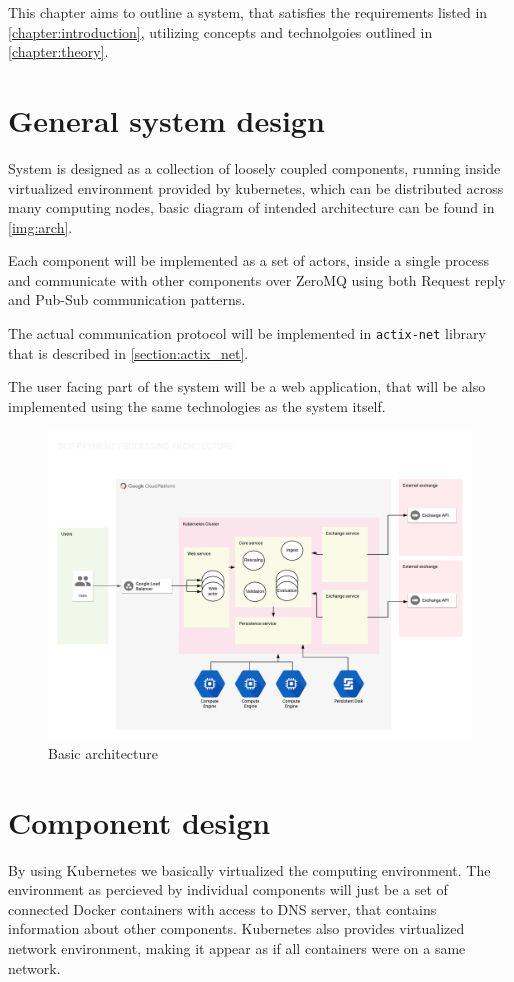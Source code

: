 This chapter aims to outline a system, that satisfies the requirements listed in \autoref{chapter:introduction}, utilizing
concepts and technolgoies outlined in \autoref{chapter:theory}.


\section{General system design}
System is designed as a collection of loosely coupled components, running inside virtualized environment provided by kubernetes, which
can be distributed across many computing nodes, basic diagram of intended architecture can be found in \autoref{img:arch}.

Each component will be implemented as a set of actors, inside a single process and communicate with other components
over ZeroMQ using both Request reply and Pub-Sub communication patterns.

The actual communication protocol will be implemented in \verb|actix-net| library that is described in \autoref{section:actix_net}.

The user facing part of the system will be a web application, that will be also implemented using the same technologies
as the system itself.

\begin{figure}[H]
    \includegraphics[width=\textwidth]{obrazky-figures/Basic architecture.png}
    \caption{Basic architecture}
    \label{img:arch}
\end{figure}


\section{Component design}
By using Kubernetes we basically virtualized the computing environment. The environment as percieved by individual components
will just be a set of connected Docker containers with access to DNS server, that contains information about other components.
Kubernetes also provides virtualized network environment, making it appear as if all containers were on a same network.

